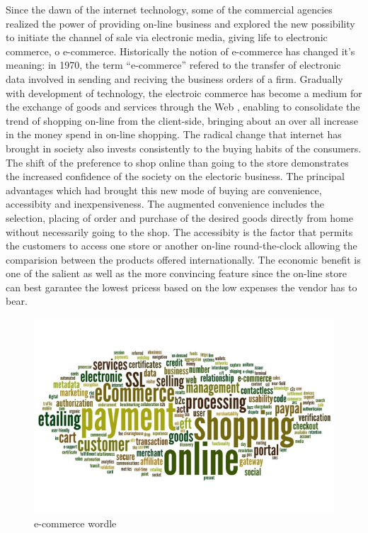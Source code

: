 Since the dawn of the internet technology, some of the commercial agencies realized the power of providing on-line business and explored the new possibility to initiate the channel of sale via electronic media, giving life to electronic commerce, o e-commerce.
\newline
Historically the notion of e-commerce has changed it's meaning: in 1970, the term “e-commerce” refered to the transfer of electronic data involved in sending and reciving the business orders of a firm. Gradually with development of technology, the electroic commerce has become a medium for the exchange of goods and services through the Web \cite{commerce_intro_1}, enabling to consolidate the trend of shopping on-line from the client-side, bringing about an over all increase in the money spend in on-line shopping.
\newline
The radical change that internet has brought in society also invests consistently to the buying habits of the consumers. The shift of the preference to shop online than going to the store demonstrates the increased confidence of the society on the electoric business.
\newline
The principal advantages which had brought this new mode of buying are convenience, accessibity and inexpensiveness.
\newline
The augmented convenience includes the selection, placing of order and purchase of the desired goods directly from home without necessarily going to the shop.
\newline
The accessibity is the factor that permits the customers to access one store or another on-line round-the-clock allowing the comparision between the products offered internationally.
\newline
The economic benefit is one of the salient as well as the more convincing feature since the on-line store can best garantee the lowest pricess based on the low expenses the vendor has to bear.
\begin{figure}[htb]
 \centering
 \includegraphics[width=0.8\linewidth]{images/introduction/ecommerce-wordle.jpg}\hfill
 \caption[e-commerce wordle]{e-commerce wordle}
 \label{fig:e_commerce_wordle}
\end{figure}
